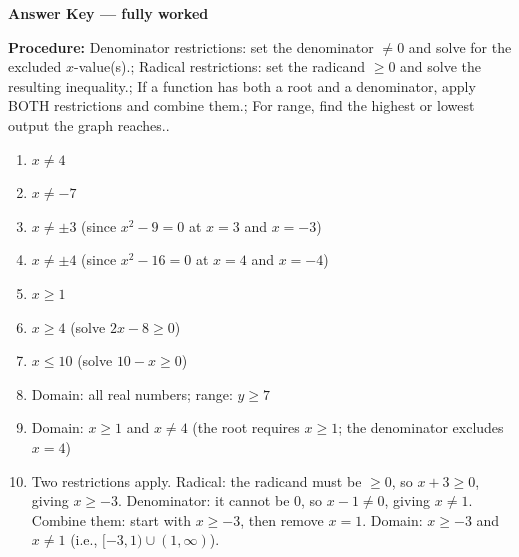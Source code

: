 \documentclass[12pt]{article}
\begin{document}
\newpage

\begin{center}{\Large \textbf{Answer Key --- fully worked}}\end{center}
\vspace{0.25cm}
\textbf{Procedure:} Denominator restrictions: set the denominator $\ne 0$ and solve for the excluded $x$-value(s).; Radical restrictions: set the radicand $\ge 0$ and solve the resulting inequality.; If a function has both a root and a denominator, apply BOTH restrictions and combine them.; For range, find the highest or lowest output the graph reaches..\\[8pt]
\begin{enumerate}[label=\textbf{\arabic*.},itemsep=7pt]
  \item $x\ne 4$
  \item $x\ne -7$
  \item $x\ne \pm 3$ (since $x^2-9=0$ at $x=3$ and $x=-3$)
  \item $x\ne \pm 4$ (since $x^2-16=0$ at $x=4$ and $x=-4$)
  \item $x\ge 1$
  \item $x\ge 4$ (solve $2x-8\ge 0$)
  \item $x\le 10$ (solve $10-x\ge 0$)
  \item Domain: all real numbers; range: $y\ge 7$
  \item Domain: $x\ge 1$ and $x\ne 4$ (the root requires $x\ge 1$; the denominator excludes $x=4$)
  \item Two restrictions apply. Radical: the radicand must be $\ge 0$, so $x+3\ge 0$, giving $x\ge -3$. Denominator: it cannot be $0$, so $x-1\ne 0$, giving $x\ne 1$. Combine them: start with $x\ge -3$, then remove $x=1$. Domain: $x\ge -3$ and $x\ne 1$ (i.e., $[-3,1)\cup(1,\infty)$).
\end{enumerate}
\end{document}

